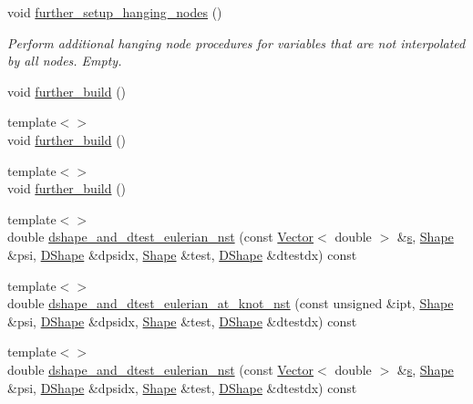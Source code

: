 \begin{DoxyCompactItemize}
void \hyperlink{classoomph_1_1PRefineableGeneralisedNewtonianQCrouzeixRaviartElement_a091f934cd38661cb0f2c0b19a9e3c042}{further\+\_\+setup\+\_\+hanging\+\_\+nodes} ()
\begin{DoxyCompactList}\small\item\em Perform additional hanging node procedures for variables that are not interpolated by all nodes. Empty. \end{DoxyCompactList}\item 
void \hyperlink{classoomph_1_1PRefineableGeneralisedNewtonianQCrouzeixRaviartElement_a4036689a0d7a43ab7f3bbb18204ec404}{further\+\_\+build} ()
\item 
{\footnotesize template$<$$>$ }\\void \hyperlink{classoomph_1_1PRefineableGeneralisedNewtonianQCrouzeixRaviartElement_a081745337b1a25f560af7199dfa75ce3}{further\+\_\+build} ()
\item 
{\footnotesize template$<$$>$ }\\void \hyperlink{classoomph_1_1PRefineableGeneralisedNewtonianQCrouzeixRaviartElement_a5c0f444f1be1636d9cb67c754bbf76ac}{further\+\_\+build} ()
\item 
{\footnotesize template$<$$>$ }\\double \hyperlink{classoomph_1_1PRefineableGeneralisedNewtonianQCrouzeixRaviartElement_a2524fa4ced356156df1882df4b3d1b91}{dshape\+\_\+and\+\_\+dtest\+\_\+eulerian\+\_\+nst} (const \hyperlink{classoomph_1_1Vector}{Vector}$<$ double $>$ \&\hyperlink{cfortran_8h_ab7123126e4885ef647dd9c6e3807a21c}{s}, \hyperlink{classoomph_1_1Shape}{Shape} \&psi, \hyperlink{classoomph_1_1DShape}{D\+Shape} \&dpsidx, \hyperlink{classoomph_1_1Shape}{Shape} \&test, \hyperlink{classoomph_1_1DShape}{D\+Shape} \&dtestdx) const
\item 
{\footnotesize template$<$$>$ }\\double \hyperlink{classoomph_1_1PRefineableGeneralisedNewtonianQCrouzeixRaviartElement_a7b223143f207155ce82ddaec2d2d7e1e}{dshape\+\_\+and\+\_\+dtest\+\_\+eulerian\+\_\+at\+\_\+knot\+\_\+nst} (const unsigned \&ipt, \hyperlink{classoomph_1_1Shape}{Shape} \&psi, \hyperlink{classoomph_1_1DShape}{D\+Shape} \&dpsidx, \hyperlink{classoomph_1_1Shape}{Shape} \&test, \hyperlink{classoomph_1_1DShape}{D\+Shape} \&dtestdx) const
\item 
{\footnotesize template$<$$>$ }\\double \hyperlink{classoomph_1_1PRefineableGeneralisedNewtonianQCrouzeixRaviartElement_a4d78303b555e3453b5dc92d25ce60c4c}{dshape\+\_\+and\+\_\+dtest\+\_\+eulerian\+\_\+nst} (const \hyperlink{classoomph_1_1Vector}{Vector}$<$ double $>$ \&\hyperlink{cfortran_8h_ab7123126e4885ef647dd9c6e3807a21c}{s}, \hyperlink{classoomph_1_1Shape}{Shape} \&psi, \hyperlink{classoomph_1_1DShape}{D\+Shape} \&dpsidx, \hyperlink{classoomph_1_1Shape}{Shape} \&test, \hyperlink{classoomph_1_1DShape}{D\+Shape} \&dtestdx) const

\end{DoxyCompactItemize}
